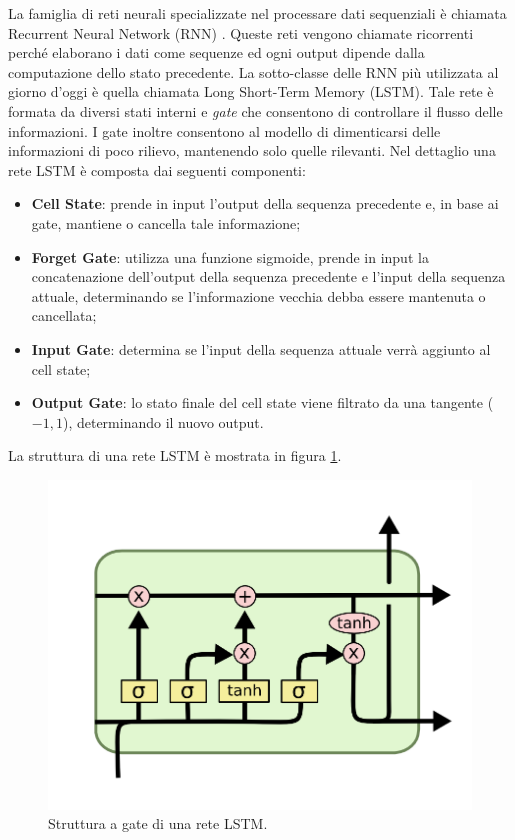 \documentclass[11pt]{report}
\begin{document}
La famiglia di reti neurali specializzate nel processare dati sequenziali è chiamata Recurrent Neural Network (RNN) \cite{rumelhart1985learning}. Queste reti vengono chiamate ricorrenti perché elaborano i dati come sequenze ed ogni output dipende dalla computazione dello stato precedente. La sotto-classe delle RNN più utilizzata al giorno d'oggi è quella chiamata Long Short-Term Memory (LSTM)\cite{hochreiter1997long}. Tale rete è formata da diversi stati interni e \textit{gate} che consentono di controllare il flusso delle informazioni. I gate inoltre consentono al modello di dimenticarsi delle informazioni di poco rilievo, mantenendo solo quelle rilevanti. Nel dettaglio una rete LSTM è composta dai seguenti componenti:
\begin{itemize}
    \item \textbf{Cell State}: prende in input l'output della sequenza precedente e, in base ai gate, mantiene o cancella tale informazione;
    
    \item \textbf{Forget Gate}: utilizza una funzione sigmoide, prende in input la concatenazione dell'output della sequenza precedente e l'input della sequenza attuale, determinando se l'informazione vecchia debba essere mantenuta o cancellata;
    
    \item \textbf{Input Gate}: determina se l'input della sequenza attuale verrà aggiunto al cell state;
    
    \item \textbf{Output Gate}: lo stato finale del cell state viene filtrato da una tangente ($-1,1$), determinando il nuovo output.
    
\end{itemize}
La struttura di una rete LSTM è mostrata in figura \ref{fig:lstm}.


\begin{figure}[h]
    \centering
    \includegraphics[scale = 0.7]{img/lstm.png}
    \caption[Struttura a gate di una rete LSTM.]{Struttura a gate di una rete LSTM.\footnotemark}
    \label{fig:lstm}
\end{figure}
\end{document}
